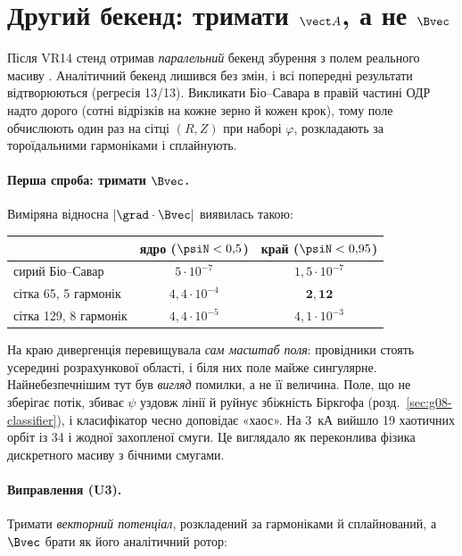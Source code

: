 \section{Другий бекенд: тримати \texorpdfstring{$\vect A$}{A}, а не \texorpdfstring{$\Bvec$}{B}}\label{sec:g09-backend}

Після VR14 стенд отримав \emph{паралельний} бекенд збурення з полем реального масиву
\cite{g09CoilBackend}. Аналітичний бекенд лишився без змін, і всі попередні результати
відтворюються (регресія 13/13). Викликати Біо--Савара в правій частині ОДР надто дорого (сотні
відрізків на кожне зерно й кожен крок), тому поле обчислюють один раз на сітці $(R,Z)$ при
наборі $\varphi$, розкладають за тороїдальними гармоніками і сплайнують.

\paragraph{Перша спроба: тримати $\Bvec$.} Виміряна відносна $|\grad\cdot\Bvec|$ виявилась такою:
\begin{center}\small
\begin{tabular}{@{}lcc@{}}
\toprule
& ядро ($\psiN<0{,}5$) & край ($\psiN<0{,}95$)\\
\midrule
сирий Біо--Савар & $5\cdot10^{-7}$ & $1{,}5\cdot10^{-7}$\\
сітка 65, 5 гармонік & $4{,}4\cdot10^{-4}$ & $\mathbf{2{,}12}$\\
сітка 129, 8 гармонік & $4{,}4\cdot10^{-5}$ & $4{,}1\cdot10^{-3}$\\
\bottomrule
\end{tabular}
\end{center}
На краю дивергенція перевищувала \emph{сам масштаб поля}: провідники стоять усередині
розрахункової області, і біля них поле майже сингулярне. Найнебезпечнішим тут був \emph{вигляд}
помилки, а не її величина. Поле, що не зберігає потік, збиває $\psi$ уздовж лінії й руйнує
збіжність Біркгофа (розд.~\ref{sec:g08-classifier}), і класифікатор чесно доповідає «хаос». На
3~кА вийшло 19 хаотичних орбіт із 34 і жодної захопленої смуги. Це виглядало як переконлива
фізика дискретного масиву з бічними смугами.

\paragraph{Виправлення (U3).} Тримати \emph{векторний потенціал}, розкладений за гармоніками й
сплайнований, а $\Bvec$ брати як його аналітичний ротор:

